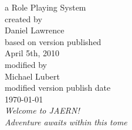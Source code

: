 \begin{titlepage}
\begin{center}
\begin{comment}
Jaern\\
\end{comment}
\vspace*{10cm}
\normalsize a Role Playing System\\
\vspace*{1cm}
created by\\
Daniel Lawrence\\
\vspace*{1cm}
based on version published\\
April 5th, 2010\\
\vspace*{1cm}
modified by\\
Michael Lubert\\
\vspace*{1cm}
modified version publish date\\
\today\\
\vspace*{1cm}
\textit{Welcome to JAERN!}\\
\textit{Adventure awaits within this tome}
\end{center}
\end{titlepage}